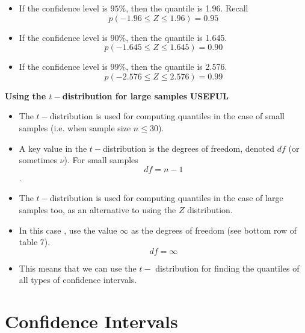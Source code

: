\documentclass[]{report}
\begin{document}


\begin{itemize}
\item If the confidence level is $95\%$, then the quantile is 1.96. Recall
\[ p( -1.96 \leq Z \leq 1.96) = 0.95 \]

\item If the confidence level is $90\%$, then the quantile is 1.645.
\[ p( -1.645 \leq Z \leq 1.645) = 0.90 \]

\item If the confidence level is $99\%$, then the quantile is 2.576.
\[ p( -2.576 \leq Z \leq 2.576) = 0.99 \]

\end{itemize}










\textbf{Using the $t-$distribution for large samples}
\textbf{USEFUL}
\begin{itemize}
\item The $t-$distribution is used for computing quantiles in the case of small samples (i.e. when sample size $n \leq 30$).
\item A key value in the $t-$distribution is the degrees of freedom, denoted $df$ (or sometimes $\nu$). For small samples \[ df= n-1\].
\item The $t-$distribution is used for computing quantiles in the case of large samples too, as an alternative to using the $Z$ distribution.
\item In this case , use the value $\infty$ as the degrees of freedom (see bottom row of table 7).
\[ df= \infty\]
\item This means that we can use the $t-$ distribution for finding the quantiles of all types of confidence intervals.

\end{itemize}




\section{Confidence Intervals}
\end{document}
